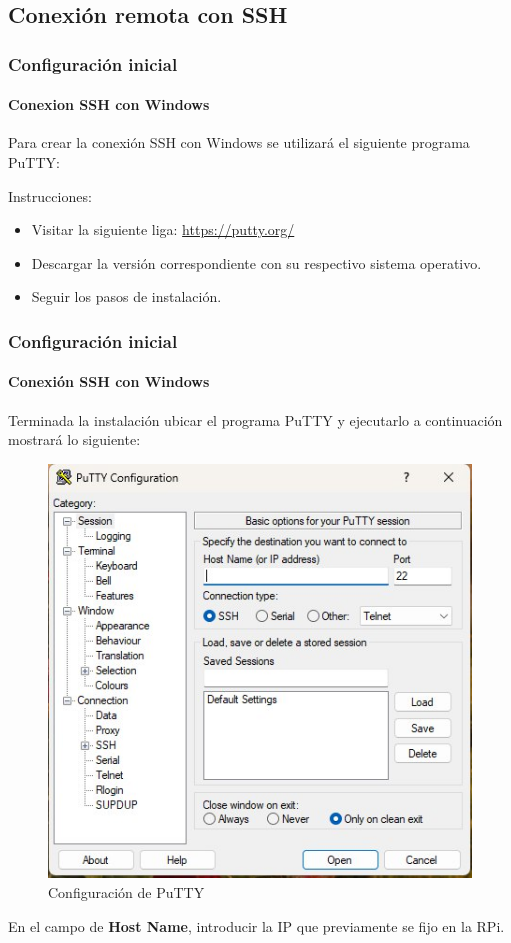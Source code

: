 \documentclass{beamer}
\begin{document}
	\subsection{Conexión remota con SSH}
	\begin{frame}
		\frametitle{Configuración inicial}
		\framesubtitle{Conexion SSH con Windows}
		Para crear la conexión SSH con Windows se utilizará el siguiente programa PuTTY:
		\begin{mybox}{Instrucciones:}
			\begin{itemize}
				\item Visitar la siguiente liga: \url{https://putty.org/}
				\item Descargar la versión correspondiente con su respectivo sistema operativo.
				\item Seguir los pasos de instalación.
			\end{itemize}
		\end{mybox}
	\end{frame}
	\begin{frame}
		\frametitle{Configuración inicial}
		\framesubtitle{Conexión SSH con Windows}
		Terminada la instalación ubicar el programa PuTTY y ejecutarlo a continuación mostrará lo siguiente:
		\begin{figure}
			\includegraphics[scale=0.4]{putty.jpeg}
			\caption{Configuración de PuTTY}
		\end{figure}
		En el campo de \textbf{Host Name}, introducir la IP que previamente se fijo en la RPi.
	\end{frame}
	
\end{document}
